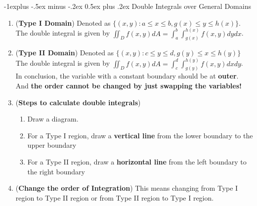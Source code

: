 \documentclass[10pt, landscape]{article}
\makeatletter
\renewcommand{\subsection}{\@startsection{subsection}{2}{0mm}%
                                {-1explus -.5ex minus -.2ex}%
                                {0.5ex plus .2ex}%
                                {\normalfont\normalsize\bfseries}}
\makeatother
\begin{document}
\begin{multicols}{4}
\subsection{Double Integrals over General Domains}
\begin{enumerate}
    \item (\textbf{Type I Domain}) Denoted as $\{(x,y): a \leq x \leq b, g(x) \leq y \leq h(x)\}$. The double integral is given by $\iint_Df(x,y)dA=\int_a^b\int_{g(x)}^{h(x)}f(x,y)dydx$.
    \item (\textbf{Type II Domain}) Denoted as $\{(x,y): c \leq y \leq d, g(y) \leq x \leq h(y)\}$ The double integral is given by $\iint_Df(x,y)dA=\int_c^d\int_{g(y)}^{h(y)}f(x,y)dxdy$. \\
    In conclusion, the variable with a constant boundary should be at \textbf{outer}. And \textbf{the order cannot be changed by just swapping the variables!}
    \item (\textbf{Steps to calculate double integrals})
    \begin{enumerate}
        \item Draw a diagram.
        \item For a Type I region, draw a \textbf{vertical line} from the lower boundary to the upper boundary
        \item For a Type II region, draw a \textbf{horizontal line} from the left boundary to the right boundary
    \end{enumerate}
    \item (\textbf{Change the order of Integration}) This means changing from Type I region to Type II region or from Type II region to Type I region.
\end{enumerate}


\end{multicols}
\end{document}
